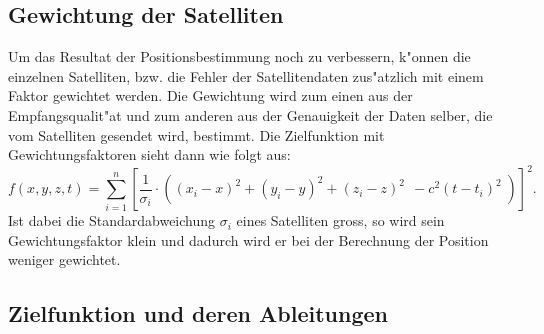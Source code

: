 \begin{refsection}
\subsection{Gewichtung der Satelliten}
Um das Resultat der Positionsbestimmung noch zu verbessern, k"onnen die
einzelnen Satelliten, bzw. die Fehler der Satellitendaten zus"atzlich
mit einem Faktor gewichtet werden. Die Gewichtung wird zum einen aus
der Empfangsqualit"at und zum anderen aus der Genauigkeit der Daten
selber, die vom Satelliten gesendet wird, bestimmt. Die Zielfunktion
mit Gewichtungsfaktoren sieht dann wie folgt aus:
\[
f(x,y,z,t) =
\sum_{i=1}^{n}\left[\frac{1}{\sigma_i}\cdot \left((x_i-x)^2 + (y_i-y)^2 + (z_i-z)^2\;\, - c^2 (t-t_i)^2\;\right)\right]^2.
\]
Ist dabei die Standardabweichung $\sigma_i$ eines Satelliten gross, so
wird sein Gewichtungsfaktor klein und dadurch wird er bei der Berechnung
der Position weniger gewichtet.

\subsection{Zielfunktion und deren Ableitungen}

\end{refsection}
